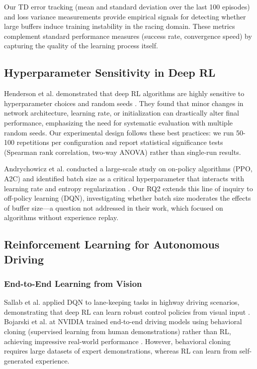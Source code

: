 Our TD error tracking (mean and standard deviation over the last 100 episodes) and loss variance measurements provide empirical signals for detecting whether large buffers induce training instability in the racing domain. These metrics complement standard performance measures (success rate, convergence speed) by capturing the quality of the learning process itself.

\subsection{Hyperparameter Sensitivity in Deep RL}

Henderson et al. demonstrated that deep RL algorithms are highly sensitive to hyperparameter choices and random seeds \cite{henderson2018deep}. They found that minor changes in network architecture, learning rate, or initialization can drastically alter final performance, emphasizing the need for systematic evaluation with multiple random seeds. Our experimental design follows these best practices: we run 50-100 repetitions per configuration and report statistical significance tests (Spearman rank correlation, two-way ANOVA) rather than single-run results.

Andrychowicz et al. conducted a large-scale study on on-policy algorithms (PPO, A2C) and identified batch size as a critical hyperparameter that interacts with learning rate and entropy regularization \cite{andrychowicz2020what}. Our RQ2 extends this line of inquiry to off-policy learning (DQN), investigating whether batch size moderates the effects of buffer size—a question not addressed in their work, which focused on algorithms without experience replay.

\subsection{Reinforcement Learning for Autonomous Driving}

\subsubsection{End-to-End Learning from Vision}

Sallab et al. applied DQN to lane-keeping tasks in highway driving scenarios, demonstrating that deep RL can learn robust control policies from visual input \cite{sallab2017deep}. Bojarski et al. at NVIDIA trained end-to-end driving models using behavioral cloning (supervised learning from human demonstrations) rather than RL, achieving impressive real-world performance \cite{bojarski2016end}. However, behavioral cloning requires large datasets of expert demonstrations, whereas RL can learn from self-generated experience.

